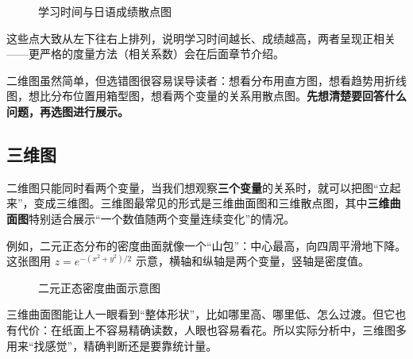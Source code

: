 \documentclass[lang=cn,10pt]{elegantbook}
\begin{document}
\begin{figure}[htbp]
  \centering
  \caption{学习时间与日语成绩散点图}
\end{figure}

这些点大致从左下往右上排列，说明学习时间越长、成绩越高，两者呈现正相关——更严格的度量方法（相关系数）会在后面章节介绍。

\begin{remark}
二维图虽然简单，但选错图很容易误导读者：想看分布用直方图，想看趋势用折线图，想比分布位置用箱型图，想看两个变量的关系用散点图。\textbf{先想清楚要回答什么问题，再选图进行展示。}
\end{remark}

\subsection{三维图}
二维图只能同时看两个变量，当我们想观察\textbf{三个变量}的关系时，就可以把图“立起来”，变成三维图。三维图最常见的形式是三维曲面图和三维散点图，其中\textbf{三维曲面图}特别适合展示“一个数值随两个变量连续变化”的情况。

例如，二元正态分布的密度曲面就像一个“山包”：中心最高，向四周平滑地下降。这张图用 $z=e^{-(x^2+y^2)/2}$ 示意，横轴和纵轴是两个变量，竖轴是密度值。

\begin{figure}[H]
  \centering
  \caption{二元正态密度曲面示意图}
\end{figure}

三维曲面图能让人一眼看到“整体形状”，比如哪里高、哪里低、怎么过渡。但它也有代价：在纸面上不容易精确读数，人眼也容易看花。所以实际分析中，三维图多用来“找感觉”，精确判断还是要靠统计量。
\end{document}
